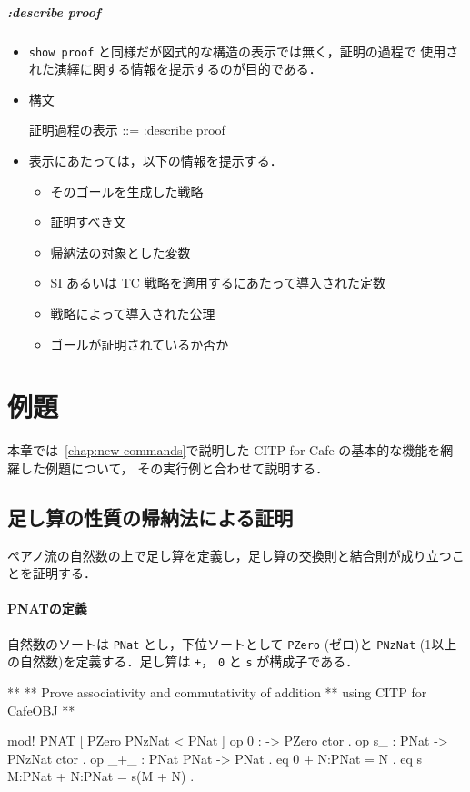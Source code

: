\documentclass[a4paper,oneside,10pt,here]{memoir}
\newenvironment{vvtm}%
{\parskip=0pt\lineskip=0pt\begin{center}\begin{minipage}{0.8\textwidth}\begin{snugshade}}%
  {\end{snugshade}\end{minipage}\end{center}}
\begin{document}
\paragraph{:describe proof}
\begin{itemize}
\item \verb|show proof| と同様だが図式的な構造の表示では無く，証明の過程で
  使用された演繹に関する情報を提示するのが目的である．
\item 構文
  \begin{vvtm}
    \begin{simplev}
   証明過程の表示 ::= :describe proof
    \end{simplev}
  \end{vvtm}
\item 表示にあたっては，以下の情報を提示する．
  \begin{itemize}
  \item そのゴールを生成した戦略
  \item 証明すべき文
  \item 帰納法の対象とした変数
  \item SI あるいは TC 戦略を適用するにあたって導入された定数
  \item 戦略によって導入された公理
  \item ゴールが証明されているか否か
  \end{itemize}
\end{itemize}


\chapter{例題}
\label{chap:prototype}

本章では~\ref{chap:new-commands}で説明した CITP for Cafe の基本的な機能を網羅した例題について，
その実行例と合わせて説明する．

\section{足し算の性質の帰納法による証明}
\label{sec:pnat}
ペアノ流の自然数の上で足し算を定義し，足し算の交換則と結合則が成り立つことを証明する．

\subsubsection{PNATの定義}
自然数のソートは \texttt{PNat} とし，下位ソートとして \texttt{PZero} (ゼロ)と
\texttt{PNzNat} (1以上の自然数)を定義する．足し算は \texttt{+}，
\texttt{0} と \texttt{s} が構成子である．
\begin{vvtm}
\begin{simplev}
**
** Prove associativity and commutativity of addition
** using CITP for CafeOBJ
**

mod! PNAT {
  [ PZero PNzNat < PNat ]
  op 0 : -> PZero {ctor} .
  op s_ : PNat -> PNzNat {ctor} .
  op _+_ : PNat PNat -> PNat .
  eq 0 + N:PNat = N .
  eq s M:PNat + N:PNat = s(M + N) .
}
\end{simplev}
\end{vvtm}
\end{document}
